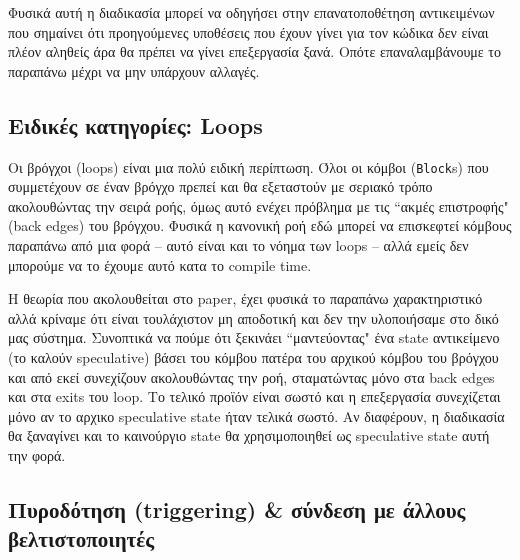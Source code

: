 Φυσικά αυτή η διαδικασία μπορεί να οδηγήσει στην επανατοποθέτηση αντικειμένων
που σημαίνει ότι προηγούμενες υποθέσεις που έχουν γίνει για τον κώδικα δεν είναι
πλέον αληθείς άρα θα πρέπει να γίνει επεξεργασία ξανά. Οπότε επαναλαμβάνουμε το
παραπάνω μέχρι να μην υπάρχουν αλλαγές.


\subsection{Ειδικές κατηγορίες: Loops}

Οι βρόγχοι (loops) είναι μια πολύ ειδική περίπτωση. Όλοι οι κόμβοι
(\texttt{Block}s) που συμμετέχουν σε έναν βρόγχο πρεπεί και θα εξεταστούν με
σεριακό τρόπο ακολουθώντας την σειρά ροής, όμως αυτό ενέχει πρόβλημα με τις
``ακμές επιστροφής" (back edges) του βρόγχου. Φυσικά η κανονική ροή εδώ μπορεί να
επισκεφτεί κόμβους παραπάνω από μια φορά – αυτό είναι και το νόημα των loops –
αλλά εμείς δεν μπορούμε να το έχουμε αυτό κατα το compile time.

Η θεωρία που ακολουθείται στο paper, έχει φυσικά το παραπάνω χαρακτηριστικό αλλά
κρίναμε ότι είναι τουλάχιστον μη αποδοτική και δεν την υλοποιήσαμε στο δικό μας
σύστημα. Συνοπτικά να πούμε ότι ξεκινάει ``μαντεύοντας" ένα state αντικείμενο (το
καλούν speculative) βάσει του κόμβου πατέρα του αρχικού κόμβου του βρόγχου και
από εκεί συνεχίζουν ακολουθώντας την ροή, σταματώντας μόνο στα back edges και
στα exits του loop. Το τελικό προϊόν είναι σωστό και η επεξεργασία συνεχίζεται
μόνο αν το αρχικο speculative state ήταν τελικά σωστό. Αν διαφέρουν, η
διαδικασία θα ξαναγίνει και το καινούργιο state θα χρησιμοποιηθεί ως speculative
state αυτή την φορά.


\subsection{Πυροδότηση (triggering) \& σύνδεση με άλλους βελτιστοποιητές}

